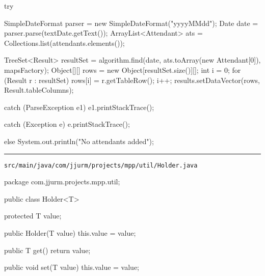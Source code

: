 \begin{javacode}
{{{{        try {
          SimpleDateFormat parser = new SimpleDateFormat("yyyyMMdd");
          Date date = parser.parse(textDate.getText());
          ArrayList<Attendant> ats = Collections.list(attendants.elements());

          TreeSet<Result> resultSet =
              algorithm.find(date, ats.toArray(new Attendant[0]), mapsFactory);
          Object[][] rows = new Object[resultSet.size()][];
          int i = 0;
          for (Result r : resultSet) {
            rows[i] = r.getTableRow();
            i++;
          }
          results.setDataVector(rows, Result.tableColumns);
        } catch (ParseException e1) {
          e1.printStackTrace();
        }
      } catch (Exception e) {
        e.printStackTrace();
      }
    } else {
      System.out.println("No attendants added");
    }
  }
}
\end{javacode}

\noindent\rule{\textwidth}{0.4pt}

\nointerlineskip
\texttt{src/main/java/com/jjurm/projects/mpp/util/Holder.java}

\begin{javacode}
package com.jjurm.projects.mpp.util;

public class Holder<T> {

  protected T value;

  public Holder(T value) {
    this.value = value;
  }

  public T get() {
    return value;
  }

  public void set(T value) {
    this.value = value;
  }

}
\end{javacode}

